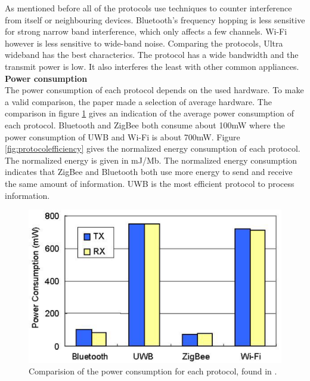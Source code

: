 \documentclass[10pt,a4paper]{article}
\begin{document}
As mentioned before all of the protocols use techniques to counter interference from itself or neighbouring devices. Bluetooth's frequency hopping is less sensitive for strong narrow band interference, which only affects a few channels. Wi-Fi however is less sensitive to wide-band noise. \cite{Bluetoothwifisurveyandcomparison} Comparing the protocols, Ultra wideband has the best characterics. The protocol has a wide bandwidth and the transmit power is low. It also interferes the least with other common appliances.\\

\textbf{Power consumption}\\
The power consumption of each protocol depends on the used hardware. To make a valid comparison, the paper \cite{comparitivestudywirelessprotocols} made a selection of average hardware. The comparison in figure \ref{fig:protocolenergy} gives an indication of the average power consumption of each protocol. Bluetooth and ZigBee both consume about 100mW where the power consumption of UWB and Wi-Fi is about 700mW. Figure \ref{fig:protocolefficiency} gives the normalized energy consumption of each protocol. The normalized energy is given in mJ/Mb. The normalized energy consumption indicates that ZigBee and Bluetooth both use more energy to send and receive the same amount of information. UWB is the most efficient protocol to process information.

\begin{figure}[H]
   \centering
   \includegraphics[width=1\textwidth]{images/protocolenergy.png}
   \caption{Comparision of the power consumption for each protocol, found in \cite{comparitivestudywirelessprotocols}.}
   \label{fig:protocolenergy}
\end{figure}
\end{document}
